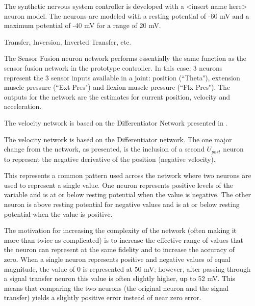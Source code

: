 The synthetic nervous system controller is developed with a <insert name here>
neuron model. The neurons are modeled with a resting potential of -60 mV and a
maximum potential of -40 mV for a range of 20 mV.



Transfer, Inversion, Inverted Transfer, etc. 


The Sensor Fusion neuron network performs essentially the same function as the
sensor fusion network in the prototype controller. In this case, 3 neurons
represent the 3 sensor inputs available in a joint: position (``Theta"),
extension muscle pressure (``Ext Pres") and flexion muscle pressure
(``Flx Pres"). The outputs for the network are the estimates for current 
position, velocity and acceleration.



The velocity network is based on the Differentiator Network presented in 
\cite{NickFunctionalSubnetwork}.



The velocity network is based on the Differentiator network. 
The one major change from the network,
as presented, is the inclusion of a second $U_{post}$ neuron to represent the
negative derivative of the position (negative velocity).



This represents
a common pattern used across the network where two neurons are used to represent
a single value. One neuron represents positive levels of the variable and is 
at or below resting potential when the value is negative. The other neuron is
above resting potential for negative values and is at or below resting potential
when the value is positive. 

The motivation for increasing the complexity of the
network (often making it more than twice as complicated) is to increase the
effective range of values that the neuron can represent at the same fidelity and
to increase the accuracy of zero. When a single neuron represents positive and
negative values of equal magnitude, the value of 0 is represented at 50 mV; 
however, after passing through a signal transfer neuron this value is often
slightly higher, up to 52 mV. This means that comparing the two neurons (the
original neuron and the signal transfer) yields a slightly positive error
instead of near zero error.

